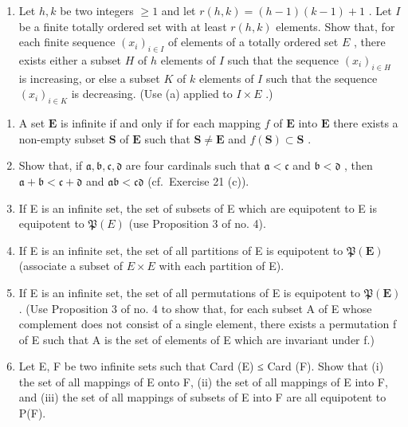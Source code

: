 \begin{enumerate}
\def\labelenumi{(\alph{enumi})}
\setcounter{enumi}{1}
\tightlist
\item
  Let \(h, k\) be two integers \(\geqslant 1\) and let \(r(h, k) = (h - 1)(k - 1) + 1\) . Let \(I\) be a finite totally ordered set with at least \(r(h, k)\) elements. Show that, for each finite sequence \((x_i)_{i \in I}\) of elements of a totally ordered set \(E\) , there exists either a subset \(H\) of \(h\) elements of \(I\) such that the sequence \((x_i)_{i \in H}\) is increasing, or else a subset \(K\) of \(k\) elements of \(I\) such that the sequence \((x_i)_{i \in K}\) is decreasing. (Use (a) applied to \(I \times E\) .)
\end{enumerate}

\exercisegroup

\begin{enumerate}
\def\labelenumi{\arabic{enumi}.}
\item
  A set \(\mathbf{E}\) is infinite if and only if for each mapping \(f\) of \(\mathbf{E}\) into \(\mathbf{E}\) there exists a non-empty subset \(\mathbf{S}\) of \(\mathbf{E}\) such that \(\mathbf{S} \neq \mathbf{E}\) and \(f(\mathbf{S}) \subset \mathbf{S}\) .
\item
  Show that, if \(\mathfrak{a}, \mathfrak{b}, \mathfrak{c}, \mathfrak{d}\) are four cardinals such that \(\mathfrak{a} < \mathfrak{c}\) and \(\mathfrak{b} < \mathfrak{d}\) , then \(\mathfrak{a} + \mathfrak{b} < \mathfrak{c} + \mathfrak{d}\) and \(\mathfrak{a}\mathfrak{b} < \mathfrak{c}\mathfrak{d}\) (cf.~Exercise 21 (c)).
\item
  If E is an infinite set, the set of subsets of E which are equipotent to E is equipotent to \(\mathfrak{P}(E)\) (use Proposition 3 of no. 4).
\item
  If E is an infinite set, the set of all partitions of E is equipotent to \(\mathfrak{P}(\mathbf{E})\) (associate a subset of \(E \times E\) with each partition of E).
\item
  If E is an infinite set, the set of all permutations of E is equipotent to \(\mathfrak{P}(\mathbf{E})\) . (Use Proposition 3 of no. 4 to show that, for each subset A of E whose complement does not consist of a single element, there exists a permutation f of E such that A is the set of elements of E which are invariant under f.)
\item
  Let E, F be two infinite sets such that Card (E) ≤ Card (F). Show that (i) the set of all mappings of E onto F, (ii) the set of all mappings of E into F, and (iii) the set of all mappings of subsets of E into F are all equipotent to P(F).

\end{enumerate}
